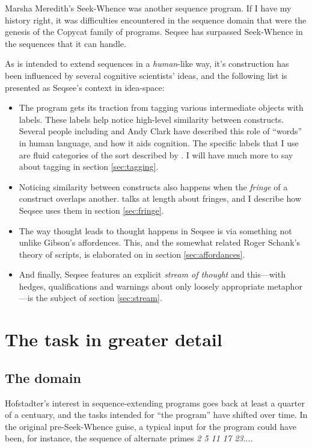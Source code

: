 \documentclass[letterpaper]{article}
\begin{document}
Marsha Meredith's Seek-Whence \cite{Meredith} was another sequence program. If I have my history right, it was difficulties encountered in the sequence domain that were the genesis of the Copycat family of programs. Seqsee has surpassed Seek-Whence in the sequences that it can handle.

As \seq is intended to extend sequences in a \emph{human}-like way, it's construction has been influenced by several cognitive scientists' ideas, and the following list is presented as Seqsee's context in idea-space:

\begin{itemize}
\item The program gets its traction from tagging various intermediate objects with labels. These labels help \seq notice high-level similarity between constructs. Several people including  and Andy Clark \cite{Clark:MindWare,Clark:MagicWords} have described this role of ``words'' in human language, and how it aids cognition. The specific labels that I use are fluid categories of the sort described by \hof.
I will have much more to say about tagging in section \ref{sec:tagging}.

\item Noticing similarity between constructs also happens when the \emph{fringe} of a construct overlaps another.  talks at length about fringes, and I describe how Seqsee uses them in section \ref{sec:fringe}. 

\item The way thought leads to thought happens in Seqsee is via something not unlike Gibson's affordences.  This, and the somewhat related Roger Schank's theory of scripts, is elaborated on in section \ref{sec:affordances}.

\item And finally, Seqsee features an explicit \emph{stream of thought} \cite{James} and this---with hedges, qualifications and warnings about only loosely appropriate metaphor---is the subject of section \ref{sec:stream}.
\end{itemize}

\section{The task in greater detail}
\label{sec:task}


\subsection{The domain}
\label{sec:domain}
Hofstadter's interest in sequence-extending programs goes back at least a quarter of a centuary, and the tasks intended for ``the program'' have shifted over time. In the original pre-Seek-Whence guise, a typical input for the program could have been, for instance, the sequence of alternate primes \emph{2 5 11 17 23$\ldots$}.
\end{document}
